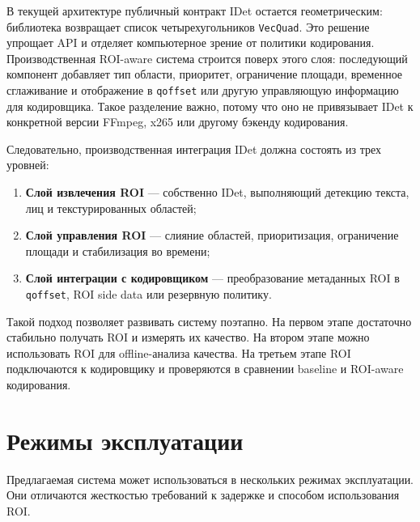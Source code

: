 \documentclass[12pt,a4paper,oneside,openany]{report}
\newcommand{\important}[1]{\textbf{#1}}
\begin{document}
В текущей архитектуре публичный контракт IDet остается геометрическим: библиотека возвращает список четырехугольников \texttt{VecQuad}. Это решение упрощает API и отделяет компьютерное зрение от политики кодирования. Производственная ROI-aware система строится поверх этого слоя: последующий компонент добавляет тип области, приоритет, ограничение площади, временное сглаживание и отображение в \texttt{qoffset} или другую управляющую информацию для кодировщика. Такое разделение важно, потому что оно не привязывает IDet к конкретной версии FFmpeg, x265 или другому бэкенду кодирования.

Следовательно, производственная интеграция IDet должна состоять из трех уровней:
\begin{enumerate}[label=\arabic*)]
\item \important{Слой извлечения ROI} --- собственно IDet, выполняющий детекцию текста, лиц и текстурированных областей;
\item \important{Слой управления ROI} --- слияние областей, приоритизация, ограничение площади и стабилизация во времени;
\item \important{Слой интеграции с кодировщиком} --- преобразование метаданных ROI в \texttt{qoffset}, ROI side data или резервную политику.
\end{enumerate}

Такой подход позволяет развивать систему поэтапно. На первом этапе достаточно стабильно получать ROI и измерять их качество. На втором этапе можно использовать ROI для offline-анализа качества. На третьем этапе ROI подключаются к кодировщику и проверяются в сравнении baseline и ROI-aware кодирования.


\section{Режимы эксплуатации}

Предлагаемая система может использоваться в нескольких режимах эксплуатации. Они отличаются жесткостью требований к задержке и способом использования ROI.
\end{document}
